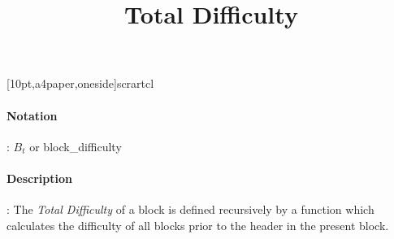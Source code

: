 [10pt,a4paper,oneside]{scrartcl}
\usepackage[latin1]{inputenc}
\usepackage{amsmath}
\usepackage{amsfonts}
\usepackage{amssymb}
\usepackage{makeidx}
\usepackage{graphicx}
\usepackage{booktabs}
\usepackage[
	authordate,
	strict,
	backend=biber
]
{biblatex-chicago}
\usepackage{mathtools}
\author{}
\title{Total Difficulty}
\date{}


\maketitle
\paragraph{Notation}: \textit{$B_t$} or block\_difficulty
\paragraph{Description}: The \textit{Total Difficulty} of a block is defined recursively by a function which calculates the difficulty of all blocks prior to the header in the present block. 



